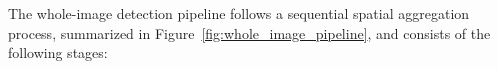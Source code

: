 
\noindent
The whole-image detection pipeline follows a sequential spatial aggregation process, summarized in Figure~\ref{fig:whole_image_pipeline}, and consists of the following stages:

